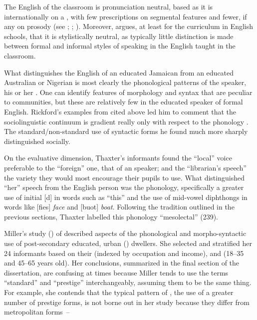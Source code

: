 The English of the classroom is pronunciation neutral, based as it is internationally on a , with few prescriptions on segmental features and fewer, if any on prosody (see \citealt[7]{HoPlatt1993}; \citealt[66--67]{MilroyMilroy1985}; \citealt[118]{Trudgill1999}).  Moreover, \citet[147]{Cheshire1999} argues, at least for the curriculum in English schools, that it is stylistically neutral, as typically little distinction is made between formal and informal styles of speaking in the English taught in the classroom. 

What distinguishes the English of an educated Jamaican from an educated Australian or Nigerian is most clearly the phonological patterns of the speaker, his or her .  One can identify features of morphology and syntax that are peculiar to communities, but these are relatively few in the educated speaker of formal English.  Rickford’s examples from  cited above led him to comment that the  sociolinguistic continuum is gradient really only with respect to the phonology \citep[278--279]{Rickford1987}.  The standard\slash non-standard use of syntactic forms he found much more sharply distinguished socially. 

On the evaluative dimension, Thaxter’s informants found the “local” voice preferable to the “foreign” one, that of an  speaker; and the “librarian’s speech” the variety they would most encourage their pupils to use.  What distinguished “her” speech from the English person was the phonology, specifically a greater use of initial [d] in words such as “this” and the use of mid-vowel diphthongs in words like [fies] \textit{face} and [buot] \textit{boat}.  Following the tradition outlined in the previous sections, Thaxter labelled this phonology “mesolectal” (239).

Miller’s study (\citeyear{Miller1987}) of  described aspects of the phonological and morpho-syntactic use of post-secondary educated, urban () dwellers.  She select\-ed and stratified her 24 informants based on their  (indexed by occupation and income),  and  (18--35 and 45--65 years old).  Her conclusions, summarized in the final section of the dissertation, are confusing at times because Miller tends to use the terms “standard” and “prestige” interchangeably, assuming them to be the same thing.  For example, she contends that the typical pattern of , the use of a greater number of prestige forms, is not borne out in her study because they differ from metropolitan forms~–  

